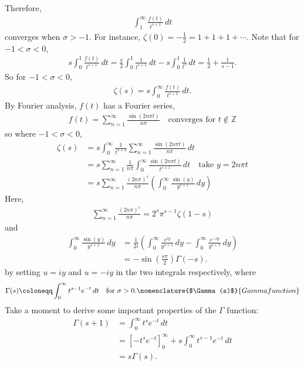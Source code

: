 \documentclass{article}
\newcommand{\1}{\mathbbm{1}}
\begin{document}
Therefore,
\begin{align*}
  \int_1^\infty \frac{f(t)}{t^{s+1}}\,dt
\end{align*}
converges when $\sigma > -1$.
For instance, $\zeta(0) = -\frac{1}{2} = 1 + 1 + 1 + \dotsb$.
Note that for $-1 < \sigma < 0$,
\begin{align*}
  s \int_0^1 \frac{f(t)}{t^{s+1}}\,dt = \frac{s}{2}\int_0^1\frac{1}{t^{s+1}}\,dt - s \int_0^1 \frac{1}{t^s}\,dt = \frac{1}{2} + \frac{1}{s-1}.
\end{align*}
So for $-1 < \sigma < 0$,
\begin{align*}
  \zeta(s) = s \int_0^\infty \frac{f(t)}{t^{s+1}}\,dt.
\end{align*}
By Fourier analysis, $f(t)$ has a Fourier series,
\begin{align*}
  f(t) = \sum_{n=1}^\infty \frac{\sin(2n\pi t)}{n\pi} \quad \text{converges for $t \notin \mathbb Z$}
\end{align*}
so where $-1 < \sigma < 0$,
\begin{align*}
  \zeta(s) &= s \int_0^\infty \frac{1}{t^{s+1}} \sum_{n=1}^\infty \frac{\sin(2n\pi t)}{n\pi}\,dt \\
           &= s \sum_{n=1}^\infty \frac{1}{n\pi} \int_0^\infty \frac{\sin(2n\pi t)}{t^{s+1}}\,dt \quad \text{take $y=2n\pi t$} \\
           &= s \sum_{n=1}^\infty \frac{(2n\pi)^s}{n\pi} \left(\int_0^\infty \frac{\sin(y)}{y^{s+1}}\,dy\right)
\end{align*}
Here,
\begin{align*}
  \sum_{n=1}^\infty \frac{(2n\pi)^s}{n\pi} = 2^s \pi^{s-1}\zeta(1-s)
\end{align*}
and
\begin{align*}
  \int_0^\infty \frac{\sin(y)}{y^{s+1}}\,dy &= \frac{1}{2i}\left(\int_0^\infty \frac{e^{iy}}{y^{s+1}}\,dy - \int_0^\infty \frac{e^{-iy}}{y^{s+1}}\,dy\right) \\
                                            &= -\sin(\tfrac{s\pi}{2}) \Gamma(-s).
\end{align*}
by setting $u=iy$ and $u=-iy$ in the two integrals respectively, where
\begin{align*}
  \Gamma(s) \coloneqq \int_0^\infty t^{s-1}e^{-t}\,dt \quad \text{for } \sigma > 0.\nomenclature{$\Gamma(s)$}{Gamma function}
\end{align*}
Take a moment to derive some important properties of the $\Gamma$ function:
\begin{align*}
  \Gamma(s+1)&= \int_0^\infty t^s e^{-t}\,dt \\
             &= [-t^s e^{-t}]_0^\infty + s \int_0^\infty t^{s-1}e^{-t}\,dt \\
             &= s \Gamma(s).
\end{align*}
\end{document}
